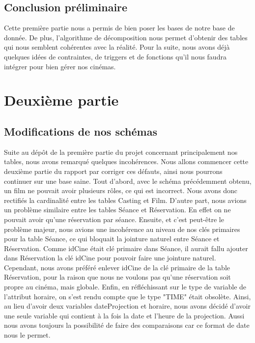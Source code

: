 \documentclass[a4paper,sffamily,12pt]{article}
\begin{document}
	
			\newpage
	
			\subsection{Conclusion préliminaire}
	
				\vspace{0.5cm}
				
				Cette première partie nous a permis de bien poser les bases de notre base de donnée. De plus, l'algorithme de décomposition nous permet d'obtenir des tables qui nous semblent cohérentes avec la réalité. Pour la suite, nous avons déjà quelques idées de contraintes, de triggers et de fonctions qu'il nous faudra intégrer pour bien gérer nos cinémas. \\			

			\newpage

	\section{Deuxième partie}

		\vspace{0.5cm}

		\subsection{Modifications de nos schémas}			

				\vspace{0.5cm}

				Suite au dépôt de la première partie du projet concernant principalement nos tables, nous avons remarqué quelques incohérences. Nous allons commencer cette deuxième partie du rapport par corriger ces défauts, ainsi nous pourrons continuer sur une base saine. Tout d'abord, avec le schéma précédemment obtenu, un film ne pouvait avoir plusieurs rôles, ce qui est incorrect. Nous avons donc rectifiés la cardinalité entre les tables Casting et Film. D'autre part, nous avions un problème similaire entre les tables Séance et Réservation. En effet on ne pouvait avoir qu'une réservation par séance. 
				\indent Ensuite, et c'est peut-être le problème majeur, nous avions une incohérence au niveau de nos clés primaires pour la table Séance, ce qui bloquait la jointure naturel entre Séance et Réservation. Comme idCine était clé primaire dans Séance, il aurait fallu ajouter dans Réservation la clé idCine pour pouvoir faire une jointure naturel. Cependant, nous avons préféré enlever idCine de la clé primaire de la table Réservation, pour la raison que nous ne voulons pas qu'une réservation soit propre au cinéma, mais globale. 
				\indent Enfin, en réfléchissant sur le type de variable de l'attribut horaire, on s'est rendu compte que le type "TIME" était obsolète. Ainsi, au lieu d'avoir deux variables dateProjection et horaire, nous avons décidé d'avoir une seule variable qui contient à la fois la date et l'heure de la projection. Aussi nous avons toujours la possibilité de faire des comparaisons car ce format de date nous le permet. \\
				
\end{document}
